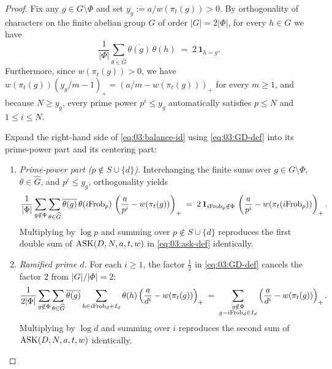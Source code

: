 \begin{proof}
Fix any $g \in G \setminus \Phi$ and set $y_g := a / w(\pi_t(g)) > 0$. By orthogonality of characters on the finite abelian group $G$ of order $|G| = 2|\Phi|$, for every $h \in G$ we have
\[
  \frac{1}{|\Phi|}\sum_{\theta \in \widehat{G}} \overline{\theta(g)}\,\theta(h) \;=\; 2\,\mathbf{1}_{h = g}.
\]
Furthermore, since $w(\pi_t(g)) > 0$, we have $w(\pi_t(g))(y_g/m - 1)_+ = (a/m - w(\pi_t(g)))_+$ for every $m \ge 1$, and because $N \ge y_g$, every prime power $p^i \le y_g$ automatically satisfies $p \le N$ and $1 \le i \le N$.

Expand the right-hand side of \eqref{eq:03:balance-id} using \eqref{eq:03:GD-def} into its prime-power part and its centering part:
\begin{enumerate}[label=(\arabic*)]
\item \emph{Prime-power part ($p \notin S \cup \{d\}$).} Interchanging the finite sums over $g \in G \setminus \Phi$, $\theta \in \widehat{G}$, and $p^i \le y_g$, orthogonality yields
  \[
    \frac{1}{|\Phi|}\sum_{g \notin \Phi}\sum_{\theta \in \widehat{G}} \overline{\theta(g)}\,\theta(i\mathrm{Frob}_p)\,\left(\frac{a}{p^i} - w(\pi_t(g))\right)_+
    \;=\; 2\,\mathbf{1}_{i\mathrm{Frob}_p \notin \Phi}\,\left(\frac{a}{p^i} - w(\pi_t(i\mathrm{Frob}_p))\right)_+.
  \]
  Multiplying by $\log p$ and summing over $p \notin S \cup \{d\}$ reproduces the first double sum of $\mathrm{ASK}(D, N, a, t, w)$ in \eqref{eq:03:ask-def} identically.

\item \emph{Ramified prime $d$.} For each $i \ge 1$, the factor $\frac{1}{2}$ in \eqref{eq:03:GD-def} cancels the factor $2$ from $|G|/|\Phi| = 2$:
  \[
    \frac{1}{2|\Phi|}\sum_{g \notin \Phi}\sum_{\theta \in \widehat{G}} \overline{\theta(g)} \sum_{h \in i\mathrm{Frob}_d + I_d} \theta(h)\left(\frac{a}{d^i} - w(\pi_t(g))\right)_+
    \;=\; \sum_{\substack{g \notin \Phi \\ g - i\mathrm{Frob}_d \in I_d}} \left(\frac{a}{d^i} - w(\pi_t(g))\right)_+.
  \]
  Multiplying by $\log d$ and summing over $i$ reproduces the second sum of $\mathrm{ASK}(D, N, a, t, w)$ identically.


\end{enumerate}
\end{proof}
